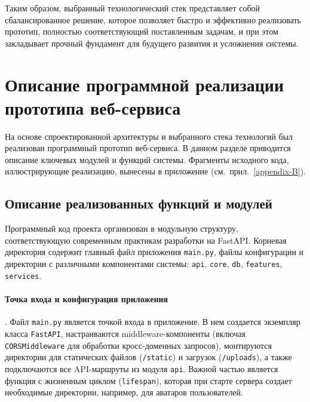 Таким образом, выбранный технологический стек представляет собой сбалансированное решение,
которое позволяет быстро и эффективно реализовать прототип, полностью соответствующий
поставленным задачам, и при этом закладывает прочный фундамент для будущего развития и
усложнения системы.




\section{Описание программной реализации прототипа веб-сервиса}

На основе спроектированной архитектуры и выбранного стека технологий был реализован
программный прототип веб-сервиса. В данном разделе приводится описание ключевых модулей и
функций системы. Фрагменты исходного кода, иллюстрирующие реализацию, вынесены в приложение
(см.~прил.~\ref{appendix-B}).




\subsection{Описание реализованных функций и модулей}

Программный код проекта организован в модульную структуру, соответствующую современным
практикам разработки на FastAPI. Корневая директория содержит главный файл приложения
\verb|main.py|, файлы конфигурации и директории с различными компонентами системы:
\verb|api|, \verb|core|, \verb|db|, \verb|features|, \verb|services|.

\paragraph{Точка входа и конфигурация приложения}. Файл \verb|main.py| является точкой
входа в приложение. В нем создается экземпляр класса \verb|FastAPI|, настраиваются
middleware-компоненты (включая \verb|CORSMiddleware| для обработки кросс-доменных запросов),
монтируются директории для статических файлов (\verb|/static|) и загрузок (\verb|/uploads|),
а также подключаются все API-маршруты из модуля \verb|api|. Важной частью является функция
с жизненным циклом (\verb|lifespan|), которая при старте сервера создает необходимые директории,
например, для аватаров пользователей.

